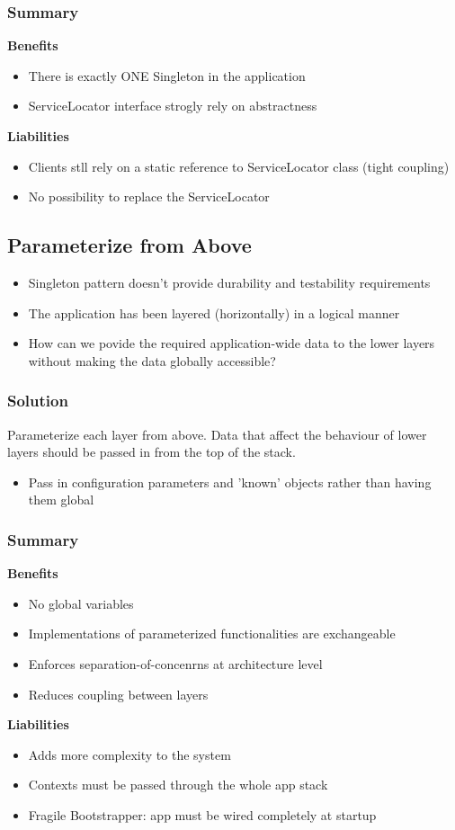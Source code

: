 \subsubsection{Summary}
\textbf{Benefits}
\begin{itemize}
    \item There is exactly ONE Singleton in the application
    \item ServiceLocator interface strogly rely on abstractness
\end{itemize}
\textbf{Liabilities}
\begin{itemize}
    \item Clients stll rely on a static reference to ServiceLocator class (tight coupling)
    \item No possibility to replace the ServiceLocator 
\end{itemize}

\subsection{Parameterize from Above}
\begin{itemize}
    \item Singleton pattern doesn't provide durability and testability requirements
    \item The application has been layered (horizontally) in a logical manner
    \item How can we povide the required application-wide data to the lower layers without making the data globally accessible?
\end{itemize}
\subsubsection{Solution}
Parameterize each layer from above. Data that affect the behaviour of lower layers should be passed in from the top of the stack.
\begin{itemize}
    \item Pass in configuration parameters and 'known' objects rather than having them global
\end{itemize}
\subsubsection{Summary}
\textbf{Benefits}
\begin{itemize}
    \item No global variables
    \item Implementations of parameterized functionalities are exchangeable
    \item Enforces separation-of-concenrns at architecture level
    \item Reduces coupling between layers
\end{itemize}
\textbf{Liabilities}
\begin{itemize}
    \item Adds more complexity to the system
    \item Contexts must be passed through the whole app stack
    \item Fragile Bootstrapper: app must be wired completely at startup
\end{itemize}

